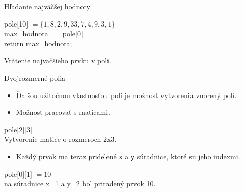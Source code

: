 \documentclass[10pt,xcolor=pdflatex,hyperref={unicode}]{beamer}
\begin{document}
\begin{frame}{Hľadanie najväčšej hodnoty}
     \begin{algorithm}[H]
        
        pole$[$10$]$ $= \{1,8,2,9,33,7,4,9,3,1\}$\\
        max\_hodnota $=$ pole[0]\\
         {
            \Indpp
        }
        return max\_hodnota;
    \caption{Vrátenie najväčšieho prvku v poli.}
    \end{algorithm}

\end{frame}

\begin{frame}{Dvojrozmerné polia}
    \begin{itemize}
        \item Ďalšou užitočnou vlastnosťou polí je možnosť vytvorenia vnorený polí.
        \item Možnosť pracovať s maticami.
    \end{itemize}
    
    \begin{algorithm}[H]
        
        pole$[$2$]$$[$3$]$\\
    \caption{Vytvorenie matice o rozmeroch 2x3.}
    
    \end{algorithm}
    \bigskip
    
    \begin{itemize}
        \item Každý prvok ma teraz pridelené \texttt{x} a \texttt{y} súradnice, ktoré su jeho indexmi.
    \end{itemize}
    
     \begin{algorithm}[H]
        
        pole$[$0$]$$[$1$]$ $= 10$\\
        \caption{na súradnice x=1 a y=2 bol priradený prvok 10.}
    
    \end{algorithm}
    
\end{frame}
\end{document}
